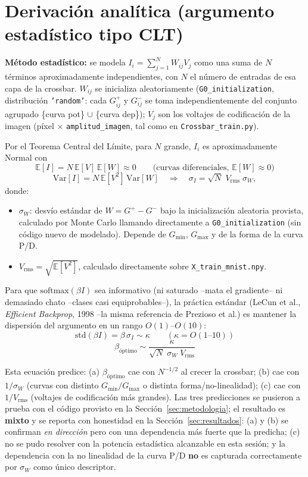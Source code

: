 \documentclass[11pt]{article}
\begin{document}
\section{Derivación analítica (argumento estadístico tipo CLT)}

\textbf{Método estadístico:} se modela $I_i = \sum_{j=1}^{N} W_{ij} V_j$ como una
suma de $N$ términos aproximadamente independientes, con $N$ el número de entradas
de esa capa de la crossbar. $W_{ij}$ se inicializa aleatoriamente
(\texttt{G0\_initialization}, distribución \texttt{'random'}: cada $G^+_{ij}$ y
$G^-_{ij}$ se toma independientemente del conjunto agrupado \{curva pot\}
$\cup$ \{curva dep\}); $V_j$ son los voltajes de codificación de la imagen
(píxel $\times$ \texttt{amplitud\_imagen}, tal como en \texttt{Crossbar\_train.py}).

Por el Teorema Central del Límite, para $N$ grande, $I_i$ es aproximadamente Normal
con
\[
\mathbb{E}[I] = N\,\mathbb{E}[V]\,\mathbb{E}[W] \approx 0
\qquad\text{(curvas diferenciales, } \mathbb{E}[W]\approx 0\text{)}
\]
\[
\mathrm{Var}[I] = N\,\mathbb{E}[V^2]\,\mathrm{Var}[W]
\quad\Longrightarrow\quad
\sigma_I = \sqrt{N}\; V_{\text{rms}}\; \sigma_W ,
\]
donde:
\begin{itemize}
  \item $\sigma_W$: desvío estándar de $W = G^+-G^-$ bajo la inicialización aleatoria
    provista, calculado por Monte Carlo llamando directamente a
    \texttt{G0\_initialization} (sin código nuevo de modelado). Depende de
    $G_{\min}$, $G_{\max}$ y de la forma de la curva P/D.
  \item $V_{\text{rms}} = \sqrt{\mathbb{E}[V^2]}$, calculado directamente sobre
    \texttt{X\_train\_mnist.npy}.
\end{itemize}

Para que $\mathrm{softmax}(\beta I)$ sea informativo (ni saturado --mata el
gradiente-- ni demasiado chato --clases casi equiprobables--), la práctica estándar
(LeCun et al., \emph{Efficient Backprop}, 1998 --la misma referencia de Prezioso et
al.) es mantener la dispersión del argumento en un rango $O(1)$--$O(10)$:
\[
\mathrm{std}(\beta I) = \beta\,\sigma_I \sim \kappa \qquad (\kappa = O(1\text{--}10))
\]
\[
\boxed{\ \beta_{\text{óptimo}} \sim \dfrac{\kappa}{\sqrt{N}\;\sigma_W\;V_{\text{rms}}}\ }
\tag{$\ast$}
\]

Esta ecuación predice: (a) $\beta_{\text{óptimo}}$ cae con $N^{-1/2}$ al crecer la
crossbar; (b) cae con $1/\sigma_W$ (curvas con distinto $G_{\min}/G_{\max}$ o
distinta forma/no-linealidad); (c) cae con $1/V_{\text{rms}}$ (voltajes de
codificación más grandes). Las tres predicciones se pusieron a prueba con el código
provisto en la Sección~\ref{sec:metodologia}; el resultado es \textbf{mixto} y se
reporta con honestidad en la Sección~\ref{sec:resultados}: (a) y (b) se confirman
\emph{en dirección} pero con una dependencia más fuerte que la predicha; (c) no se
pudo resolver con la potencia estadística alcanzable en esta sesión; y la
dependencia con la no linealidad de la curva P/D \textbf{no} es capturada
correctamente por $\sigma_W$ como único descriptor.
\end{document}
